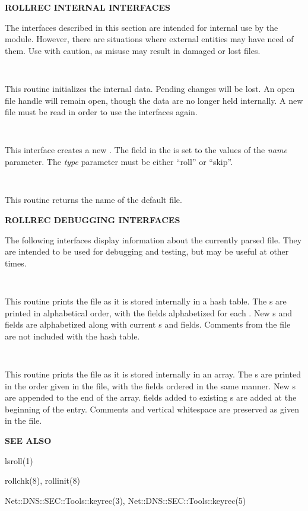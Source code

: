 {\bf ROLLREC INTERNAL INTERFACES}

The interfaces described in this section are intended for internal use by the
 module.  However, there are situations where external
entities may have need of them.  Use with caution, as misuse may result in
damaged or lost  files.

\begin{description}

\item {}\verb" "

This routine initializes the internal  data.  Pending changes
will be lost.  An open  file handle will remain open, though
the data are no longer held internally.  A new  file must be
read in order to use the  interfaces again.

\item {}\verb" "

This interface creates a new .  The  field
in the  is set to the values of the {\it name} parameter.  The
{\it type} parameter must be either ``roll'' or ``skip''.

\item {}\verb" "

This routine returns the name of the default  file.

\end{description}

{\bf ROLLREC DEBUGGING INTERFACES}

The following interfaces display information about the currently parsed
 file.  They are intended to be used for debugging and
testing, but may be useful at other times.

\begin{description}

\item {}\verb" "

This routine prints the  file as it is stored internally in a
hash table.  The s are printed in alphabetical order, with the
fields alphabetized for each .  New s and
 fields are alphabetized along with current s
and fields.  Comments from the  file are not included with the
hash table.

\item {}\verb" "

This routine prints the  file as it is stored internally in an
array.  The s are printed in the order given in the file, with
the fields ordered in the same manner.  New s are appended to
the end of the array.   fields added to existing
s are added at the beginning of the  entry.
Comments and vertical whitespace are preserved as given in the
 file.

\end{description}

{\bf SEE ALSO}

lsroll(1)

rollchk(8),
rollinit(8)

Net::DNS::SEC::Tools::keyrec(3),
Net::DNS::SEC::Tools::keyrec(5)


